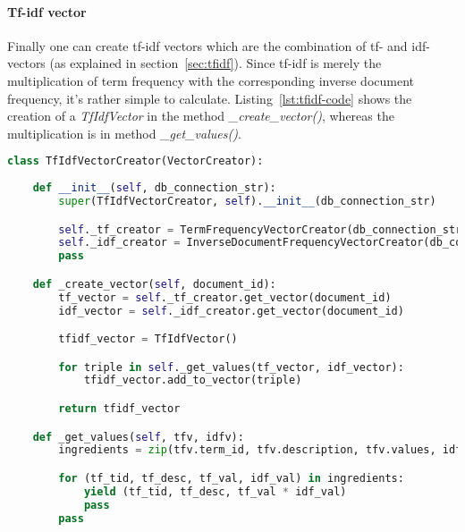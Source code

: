\paragraph{Tf-idf vector}
Finally one can create tf-idf vectors which are the combination of tf- and idf-vectors (as explained in section~\ref{sec:tfidf}).
Since tf-idf is merely the multiplication of term frequency with the corresponding inverse document frequency, it's rather simple to calculate.
Listing~\ref{lst:tfidf-code} shows the creation of a \textit{TfIdfVector} in the method \textit{\_create\_vector()}, whereas the multiplication is in method \textit{\_get\_values()}.

\begin{lstlisting}[language=Python,caption={Python code for calculating tfidf-vectos on basis on tf- and idf-vectors},label={lst:tfidf-code},float=h]
class TfIdfVectorCreator(VectorCreator):
    
    def __init__(self, db_connection_str):
        super(TfIdfVectorCreator, self).__init__(db_connection_str)

        self._tf_creator = TermFrequencyVectorCreator(db_connection_str)
        self._idf_creator = InverseDocumentFrequencyVectorCreator(db_connection_str)
        pass

    def _create_vector(self, document_id):
        tf_vector = self._tf_creator.get_vector(document_id)
        idf_vector = self._idf_creator.get_vector(document_id)

        tfidf_vector = TfIdfVector()

        for triple in self._get_values(tf_vector, idf_vector):
            tfidf_vector.add_to_vector(triple)

        return tfidf_vector

    def _get_values(self, tfv, idfv):
        ingredients = zip(tfv.term_id, tfv.description, tfv.values, idfv.values)

        for (tf_tid, tf_desc, tf_val, idf_val) in ingredients:
            yield (tf_tid, tf_desc, tf_val * idf_val)
            pass
        pass
\end{lstlisting}

